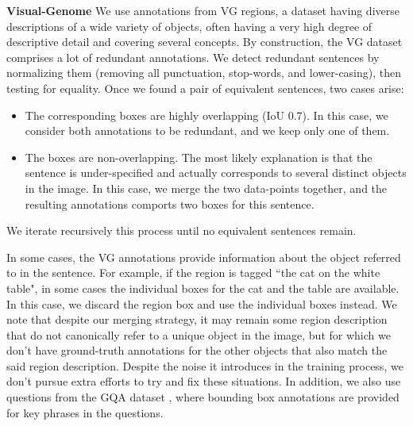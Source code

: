 \textbf{Visual-Genome}
We use annotations from VG regions, a dataset having diverse descriptions of a wide variety of objects, often having a very high degree of descriptive detail and covering several concepts. 
By construction, the VG dataset comprises a lot of redundant annotations. We detect redundant sentences by normalizing them (removing all punctuation, stop-words, and lower-casing), then testing for equality. Once we found a pair of equivalent sentences, two cases arise:
\begin{itemize}
    \item The corresponding boxes are highly overlapping (IoU  0.7). In this case, we consider both annotations to be redundant, and we keep only one of them.
    \item The boxes are non-overlapping. The most likely explanation is that the sentence is under-specified and actually corresponds to several distinct objects in the image. In this case, we merge the two data-points together, and the resulting annotations comports two boxes for this sentence.
\end{itemize}
We iterate recursively this process until no equivalent sentences remain.

In some cases, the VG annotations provide information about the object referred to in the sentence. For example, if the region is tagged ``the cat on the white table", in some cases the individual boxes for the cat and the table are available. In this case, we discard the region box and use the individual boxes instead.
We note that despite our merging strategy, it may remain some region description that do not canonically refer to a unique object in the image, but for which we don’t have ground-truth annotations for the other objects that also match the said region description. Despite the noise it introduces in the training process, we don’t pursue extra efforts to try and fix these situations.
In addition, we also use questions from the GQA dataset \cite{hudson_gqa_2019}, where bounding box annotations are provided for key phrases in the questions. 





